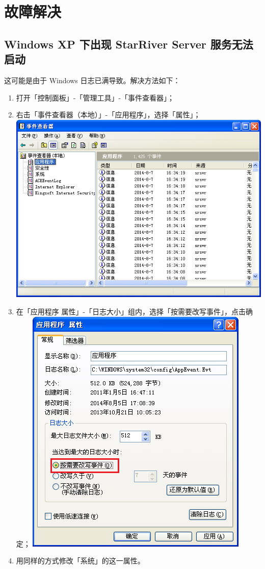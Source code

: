 \section{故障解决}\label{ux6545ux969cux89e3ux51b3}

\subsection{Windows XP 下出现 StarRiver Server
服务无法启动}\label{windows-xp-ux4e0bux51faux73b0-starriver-server-ux670dux52a1ux65e0ux6cd5ux542fux52a8}

这可能是由于 Windows 日志已满导致。解决方法如下：

\begin{enumerate}
\def\labelenumi{\arabic{enumi}.}
\itemsep1pt\parskip0pt
\item
  打开「控制面板」-「管理工具」-「事件查看器」；
\item
  右击「事件查看器（本地）」-「应用程序」，选择「属性」；
  \includegraphics{img/winxp_event.png}
\item
  在「应用程序
  属性」-「日志大小」组内，选择「按需要改写事件」，点击确定；
  \includegraphics{img/winxp_event_overwrite.png}
\item
  用同样的方式修改「系统」的这一属性。
\end{enumerate}
